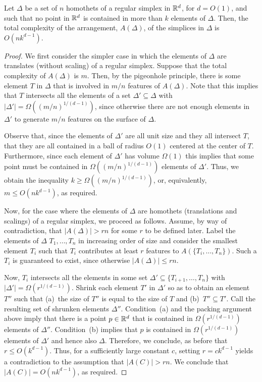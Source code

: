 \documentclass[lotsofwhite]{patmorin}
\begin{document}
\begin{lem}
  Let $\Delta$ be a set of $n$ homothets of a regular simplex in $\mathbb{R}^d$,
  for $d=O(1)$, and such that no point in $\mathbb{R}^d$ is contained in more
  than $k$ elements of $\Delta$.  Then, the total complexity of the
  arrangement, $A(\Delta)$, of the simplices in $\Delta$ is $O(nk^{d-1})$.
\end{lem}

\begin{proof}
  We first consider the simpler case in which the elements of $\Delta$
  are translates (without scaling) of a regular simplex.  Suppose that
  the total complexity of $A(\Delta)$ is $m$.  Then, by the pigeonhole
  principle, there is some element $T$ in $\Delta$ that is involved
  in $m/n$ features of $A(\Delta)$.  Note that this implies that $T$
  intersects all the elements of a set $\Delta'\subseteq\Delta$ with
  $|\Delta'|=\Omega((m/n)^{1/(d-1)})$, since otherwise there are not
  enough elements in $\Delta'$ to generate $m/n$ features on the surface
  of $\Delta$.

  Observe that, since the elements of $\Delta'$ are all unit size and
  they all intersect $T$, that they are all contained in a ball of
  radius $O(1)$ centered at the center of $T$.  Furthermore, since each
  element of $\Delta'$ has volume $\Omega(1)$ this implies that some point
  must be contained in $\Omega((m/n)^{1/(d-1)})$ elements of $\Delta'$.
  Thus, we obtain the inequality $k \ge \Omega((m/n)^{1/(d-1)})$, or,
  equivalently, $m \le O(nk^{d-1})$, as required.

  Now, for the case where the elements of $\Delta$ are homothets
  (translations and scalings) of a regular simplex, we proceed as follows.
  Assume, by way of contradiction, that $|A(\Delta)| > rn$ for some $r$
  to be defined later.  Label the elements of $\Delta$ $T_1,\ldots,T_n$
  in increasing order of size and consider the smallest element $T_i$ such
  that $T_i$ contributes at least $r$ features to $A(\{T_i,\ldots,T_n\})$.
  Such a $T_i$ is guaranteed to exist, since otherwise $|A(\Delta)|\le
  rn$.

  Now, $T_i$ intersects all the elements in some set $\Delta'\subseteq
  \{T_{i+1},\ldots,T_n\}$ with $|\Delta'| = \Omega(r^{1/(d-1)})$.
  Shrink each element $T'$ in $\Delta'$ so as to obtain an element
  $T''$ such that (a)~the size of $T''$ is equal to the size of $T$ and
  (b)~$T'' \subseteq T'$.  Call the resulting set of shrunken elements
  $\Delta''$.  Condition~(a) and the packing argument above imply that
  there is a point $p\in\mathbb{R}^d$ that is contained in $\Omega(r^{1/(d-1)})$
  elements of $\Delta''$.  Condition~(b) implies that $p$ is contained in
  $\Omega(r^{1/(d-1)})$ elements of $\Delta'$ and hence also $\Delta$.
  Therefore, we conclude, as before that $r \le O(k^{d-1})$.  Thus,
  for a sufficiently large constant $c$, setting $r=ck^{d-1}$ yields a
  contradiction to the assumption that $|A(C)| > rn$.  We conclude that
  $|A(C)| = O(nk^{d-1})$, as required.
\end{proof}
\end{document}
